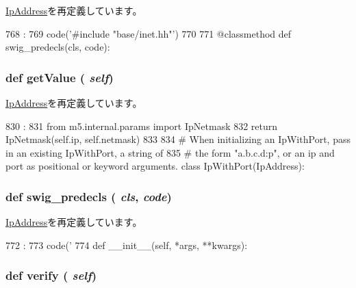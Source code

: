 \hyperlink{classm5_1_1params_1_1IpAddress_a0b408a11a14bd1d770e28f71a6e14ab5}{IpAddress}を再定義しています。


\begin{DoxyCode}
768                                :
769         code('#include "base/inet.hh"')
770 
771     @classmethod
    def swig_predecls(cls, code):
\end{DoxyCode}
\hypertarget{classm5_1_1params_1_1IpNetmask_acc340fbd4335fa34f9d57fb454b28ed0}{
\subsubsection[{getValue}]{\setlength{\rightskip}{0pt plus 5cm}def getValue ( {\em self})}}
\label{classm5_1_1params_1_1IpNetmask_acc340fbd4335fa34f9d57fb454b28ed0}


\hyperlink{classm5_1_1params_1_1IpAddress_acc340fbd4335fa34f9d57fb454b28ed0}{IpAddress}を再定義しています。


\begin{DoxyCode}
830                       :
831         from m5.internal.params import IpNetmask
832         return IpNetmask(self.ip, self.netmask)
833 
834 # When initializing an IpWithPort, pass in an existing IpWithPort, a string of
835 # the form "a.b.c.d:p", or an ip and port as positional or keyword arguments.
class IpWithPort(IpAddress):
\end{DoxyCode}
\hypertarget{classm5_1_1params_1_1IpNetmask_ab3dbcf5716623eac67a8ccc074fa7e13}{
\subsubsection[{swig\_\-predecls}]{\setlength{\rightskip}{0pt plus 5cm}def swig\_\-predecls ( {\em cls}, \/   {\em code})}}
\label{classm5_1_1params_1_1IpNetmask_ab3dbcf5716623eac67a8ccc074fa7e13}


\hyperlink{classm5_1_1params_1_1IpAddress_ab3dbcf5716623eac67a8ccc074fa7e13}{IpAddress}を再定義しています。


\begin{DoxyCode}
772                                 :
773         code('%
774 
    def __init__(self, *args, **kwargs):
\end{DoxyCode}
\hypertarget{classm5_1_1params_1_1IpNetmask_aea46c698f871a6aece7a52d69bd684dc}{
\subsubsection[{verify}]{\setlength{\rightskip}{0pt plus 5cm}def verify ( {\em self})}}
\label{classm5_1_1params_1_1IpNetmask_aea46c698f871a6aece7a52d69bd684dc}



